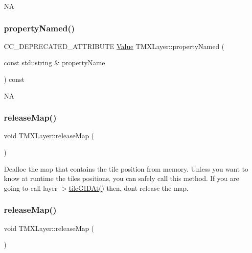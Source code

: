 NA \mbox{\label{classTMXLayer_af6fefaddaa8d6208b1d375f08e6d3ad6}} 
\subsubsection{\texorpdfstring{property\+Named()}{propertyNamed()}\hspace{0.1cm}{\footnotesize\ttfamily [2/2]}}
{\footnotesize\ttfamily C\+C\+\_\+\+D\+E\+P\+R\+E\+C\+A\+T\+E\+D\+\_\+\+A\+T\+T\+R\+I\+B\+U\+TE \hyperlink{classValue}{Value} T\+M\+X\+Layer\+::property\+Named (\begin{DoxyParamCaption}\item[{const std\+::string \&}]{property\+Name }\end{DoxyParamCaption}) const\hspace{0.3cm}{\ttfamily [inline]}}

NA \mbox{\label{classTMXLayer_a45ad4c67a9ea4e2f2ce3d6d6228e5402}} 
\subsubsection{\texorpdfstring{release\+Map()}{releaseMap()}\hspace{0.1cm}{\footnotesize\ttfamily [1/2]}}
{\footnotesize\ttfamily void T\+M\+X\+Layer\+::release\+Map (\begin{DoxyParamCaption}{ }\end{DoxyParamCaption})}

Dealloc the map that contains the tile position from memory. Unless you want to know at runtime the tiles positions, you can safely call this method. If you are going to call layer-\/$>$\hyperlink{classTMXLayer_a244f8bff6274b630488bf6ebebdeee5a}{tile\+G\+I\+D\+At()} then, don\textquotesingle{}t release the map. \mbox{\label{classTMXLayer_a45ad4c67a9ea4e2f2ce3d6d6228e5402}} 
\subsubsection{\texorpdfstring{release\+Map()}{releaseMap()}\hspace{0.1cm}{\footnotesize\ttfamily [2/2]}}
{\footnotesize\ttfamily void T\+M\+X\+Layer\+::release\+Map (\begin{DoxyParamCaption}{ }\end{DoxyParamCaption})}

